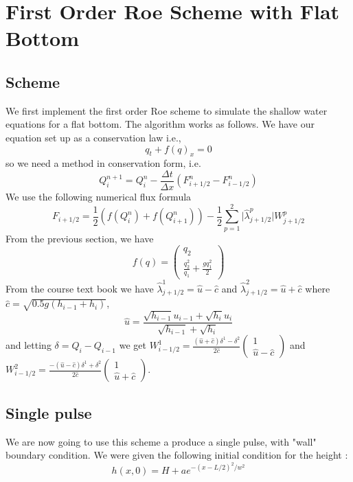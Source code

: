 \section{First Order Roe Scheme with Flat Bottom}
\subsection{Scheme}
We first implement the first order Roe scheme to simulate the shallow water equations for a flat bottom. The algorithm works as follows. We have our equation set up as a conservation law i.e.,
$$q_t+f(q)_x=0$$
so we need a method in conservation form, i.e.
$$Q_i^{n+1} = Q_i^n - \frac{\Delta t}{\Delta x}(F^n_{i+1/2}-F^n_{i-1/2})$$ 
We use the following numerical flux formula
$$F_{i+1/2}=\frac{1}{2}(f(Q_i^n)+f(Q_{i+1}^n))-\frac{1}{2}\sum_{p=1}^2 \lvert \hat{\lambda}_{j+1/2}^p \rvert W_{j+1/2}^p$$
From the previous section, we have 
$$f(q) = \begin{pmatrix}
q_2\\ \frac{q_2^2}{q_1} + \frac{gq_1^2}{2}
\end{pmatrix}$$
From the course text book we have $\hat{\lambda}^1_{j+1/2} = \hat{u}-\hat{c}$ and $\hat{\lambda}^2_{j+1/2} = \hat{u}+\hat{c}$ where $\hat{c}=\sqrt{0.5g(h_{i-1}+h_i)}$,
$$\hat{u}=\frac{\sqrt{h_{i-1}}u_{i-1}+\sqrt{h_i}u_i}{\sqrt{h_{i-1}}+\sqrt{h_i}}$$ 
and letting $\delta = Q_i - Q_{i-1}$ we get $W^1_{i-1/2}=\frac{(\hat{u}+\hat{c})\delta^1 - \delta^2}{2\hat{c}}\begin{pmatrix}
1\\ \hat{u} - \hat{c}
\end{pmatrix}$ and $W^2_{i-1/2}=\frac{-(\hat{u}-\hat{c})\delta^1 + \delta^2}{2\hat{c}}\begin{pmatrix}
1\\ \hat{u} + \hat{c}
\end{pmatrix}$.

\subsection{Single pulse}
We are now going to use this scheme a produce a single pulse, with "wall" boundary condition. We were given the following initial condition for the height :
$$h(x,0) = H + ae^{-(x-L/2)^2/w^2}$$

